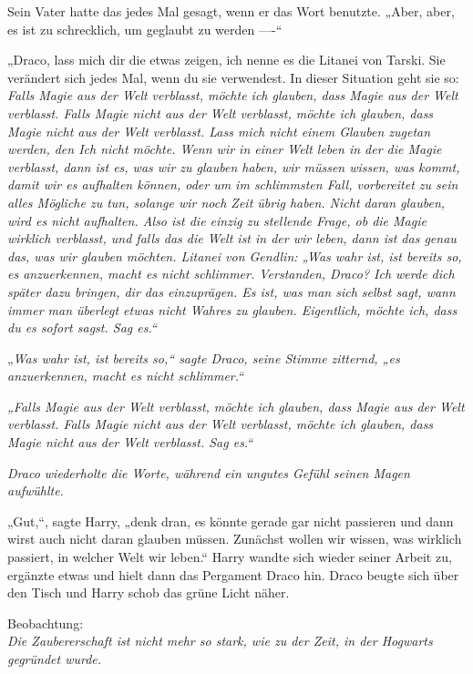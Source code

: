 {Sein Vater hatte das jedes Mal gesagt, wenn er das Wort benutzte. „Aber, aber, es ist zu schrecklich, um geglaubt zu werden ----“

„Draco, lass mich dir die etwas zeigen, ich nenne es die Litanei von Tarski. Sie verändert sich jedes Mal, wenn du sie verwendest. In dieser Situation geht sie so: \emph{Falls Magie aus der Welt verblasst, möchte ich glauben, dass Magie aus der Welt verblasst. Falls Magie nicht aus der Welt verblasst, möchte ich glauben, dass Magie nicht aus der Welt verblasst. Lass mich nicht einem Glauben zugetan werden, den Ich nicht möchte. Wenn wir in einer Welt leben in der die Magie verblasst, \emph{dann ist es, was wir zu glauben haben,} wir müssen wissen, was kommt, damit wir es aufhalten können, oder um im schlimmsten Fall, vorbereitet zu sein alles Mögliche zu tun, solange wir noch Zeit übrig haben. Nicht daran glauben, wird es nicht aufhalten. Also ist die einzig zu stellende Frage, ob die Magie wirklich verblasst, und falls das die Welt ist in der wir leben, dann ist das genau das, was wir glauben möchten. Litanei von Gendlin: „\emph{Was wahr ist, ist bereits so, es anzuerkennen, macht es nicht schlimmer.} Verstanden, Draco? Ich werde dich später dazu bringen, dir das einzuprägen. Es ist, was man sich selbst sagt, wann immer man überlegt etwas nicht Wahres zu glauben. \emph{Eigentlich, möchte ich, dass du es sofort sagst.} Sag es.“}

„\emph{Was wahr ist, ist bereits so,“ sagte Draco, seine Stimme zitternd, „\emph{es anzuerkennen, macht es nicht schlimmer.“}}

\emph{„Falls Magie aus der Welt verblasst, möchte ich glauben, dass Magie aus der Welt verblasst. Falls Magie nicht aus der Welt verblasst, möchte ich glauben, dass Magie nicht aus der Welt verblasst. \emph{Sag es.“}}

\emph{Draco wiederholte die Worte, während ein ungutes Gefühl seinen Magen aufwühlte.}

„Gut,“, sagte Harry, „denk dran, es könnte gerade gar nicht passieren und dann wirst auch nicht daran glauben müssen. Zunächst wollen wir wissen, was wirklich passiert, in welcher Welt wir leben.“ Harry wandte sich wieder seiner Arbeit zu, ergänzte etwas und hielt dann das Pergament Draco hin. Draco beugte sich über den Tisch und Harry schob das grüne Licht näher.

Beobachtung:\\ \emph{Die Zaubererschaft ist nicht mehr so stark, wie zu der Zeit, in der Hogwarts gegründet wurde.}

}
